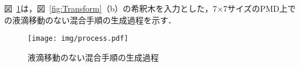 図~\ref{fig:process}は，図~\ref{fig:Transform}（b）の希釈木を入力とした，7$\times$7サイズのPMD上での液滴移動のない混合手順の生成過程を示す．



\begin{figure}[tbp]
 \centering\texttt{[image: img/process.pdf]}
 \caption{液滴移動のない混合手順の生成過程}\label{fig:process}
\end{figure}

\section{}
